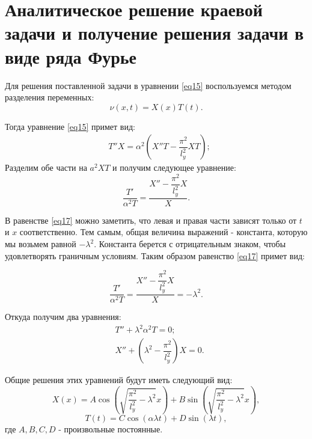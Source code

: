 \section{Аналитическое решение  краевой  задачи  и  получение  решения задачи в виде ряда Фурье}
{

Для решения поставленной задачи в уравнении \eqref{eq15} воспользуемся методом разделения переменных:
    \begin{equation}\label{eq16}
        \nu(x,t) = X(x)T(t).
    \end{equation}

Тогда уравнение \eqref{eq15} примет вид:    
    \begin{align*}
        &T''X = \alpha^2 \left(X''T - \dfrac{\pi^2}{l_y^2} XT \right);        
    \end{align*}
Разделим обе части на $a^2XT$ и получим следующее уравнение:
    \begin{equation}\label{eq17}
        \dfrac{T'}{\alpha^2T} = \dfrac{X''-\dfrac{\pi^2}{l_y^2}X}{X}.
    \end{equation}

В равенстве \eqref{eq17} можно заметить, что левая и правая части зависят только от $t$ и  $x$ соответственно. Тем самым, общая величина выражений - константа, которую мы возьмем равной $-\lambda^2$. Константа берется с отрицательным знаком, чтобы удовлетворять граничным условиям. Таким образом равенство \eqref{eq17} примет вид:

\begin{equation}\label{eq17}
        \dfrac{T'}{\alpha^2T} = \dfrac{
        X''-\dfrac{\pi^2}{l_y^2}X}{X} = -\lambda^2.
\end{equation}

Откуда получим два уравнения:
\begin{align*}
		& T''+\lambda^2\alpha^2T=0;\\
		& X''+(\lambda^2-\dfrac{\pi^2}{l_y^2})X = 0.
\end{align*}

Общие решения этих уравнений будут иметь следующий вид:
\begin{equation}\label{x_c}
	X(x) = A\cos(\sqrt{\dfrac{\pi^2}{l_y^2}-\lambda^2}x) + B\sin(\sqrt{\dfrac{\pi^2}{l_y^2}-\lambda^2}x),
\end{equation}
\begin{equation}\label{t_c}
	T(t) = C\cos(\alpha\lambda t) + D\sin(\lambda t),
\end{equation}
где $A, B, C, D$ - произвольные постоянные.

}
